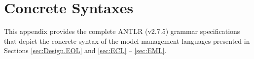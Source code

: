 \chapter{Concrete Syntaxes}
\label{app:Syntaxes}

This appendix provides the complete ANTLR (v2.7.5) \cite{ANTLR} grammar specifications that depict the concrete syntax of the model management languages presented in Sections \ref{sec:Design.EOL} and \ref{sec:ECL} -- \ref{sec:EML}.









